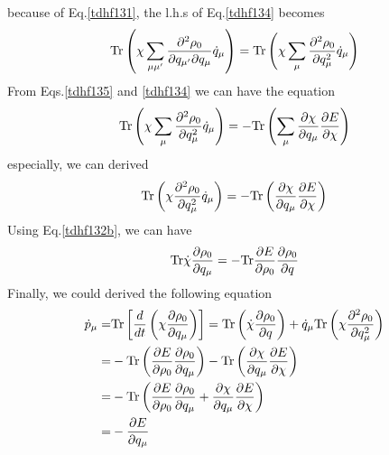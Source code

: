   because of Eq.\eqref{tdhf131}, the l.h.s of Eq.\eqref{tdhf134} becomes
  \begin{equation}
   {\rm Tr}\left( \chi \sum_{\mu\mu\rq}\frac{\partial^2\rho_0}{\partial q_{\mu\rq} \partial q_{\mu}} \dot{q}_\mu \right) = {\rm Tr}\left( \chi \sum_{\mu}\frac{\partial^2\rho_0}{\partial q_{\mu}^2} \dot{q}_\mu \right)  	 \label{tdhf135}
  \end{equation}
  From Eqs.\eqref{tdhf135} and \eqref{tdhf134} we can have the equation
  \begin{equation}
    {\rm Tr}\left( \chi \sum_{\mu}\frac{\partial^2\rho_0}{\partial q_{\mu}^2} \dot{q}_\mu \right) =  - {\rm Tr}\left( \sum_{\mu}\frac{\partial \chi}{\partial q_{\mu}} \frac{\partial E}{\partial\chi}  \right)	 \label{tdhf136}
  \end{equation}
  especially, we can derived
  \begin{equation}
    {\rm Tr}\left( \chi \frac{\partial^2\rho_0}{\partial q_{\mu}^2} \dot{q}_\mu \right) =  - {\rm Tr}\left( \frac{\partial \chi}{\partial q_{\mu}} \frac{\partial E}{\partial\chi}  \right)	 \label{tdhf137}
  \end{equation}
  Using Eq.\eqref{tdhf132b}, we can have
  \begin{equation}
    {\rm Tr}\dot{\chi}\frac{\partial\rho_0}{\partial q_\mu} = -{\rm Tr}	\frac{\partial E}{\partial \rho_0} \frac{\partial \rho_0}{\partial q} \label{tdhf138}
  \end{equation}
  Finally, we could derived the following equation 
  \begin{equation}
    \begin{aligned}
      \dot{p}_\mu =& {\rm Tr}\left[ \frac{d}{dt}\left(\chi \frac{\partial\rho_0}{\partial q_\mu}\right) \right] = {\rm Tr}\left(\dot{\chi}\frac{\partial\rho_0}{\partial q}\right) + \dot{q}_\mu {\rm Tr}\left(\chi\frac{\partial^2\rho_0}{\partial q_\mu^2}\right) 	 \label{tdhf139}   \\ 
      =& -{\rm Tr}	\left(\frac{\partial E}{\partial \rho_0} \frac{\partial \rho_0}{\partial q_\mu} \right)- {\rm Tr}\left( \frac{\partial \chi}{\partial q_{\mu}} \frac{\partial E}{\partial\chi}  \right) \\
      =& - {\rm Tr}\left(\frac{\partial E}{\partial \rho_0} \frac{\partial \rho_0}{\partial q_{\mu}} + \frac{\partial \chi}{\partial q_{\mu}} \frac{\partial E}{\partial\chi} \right) \\
      =& -\frac{\partial E}{\partial q_\mu}
    \end{aligned}
  \end{equation}

